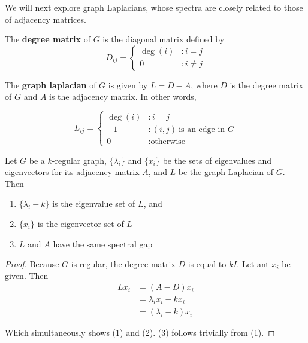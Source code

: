 We will next explore graph Laplacians, whose spectra are closely related to
those of adjacency matrices.

\begin{definition}
  The \textbf{degree matrix} of $G$ is the diagonal matrix defined by
  \[
    D_{ij} = \begin{cases}
      \deg(i) &: i = j \\
      0 &: i \neq j
    \end{cases}
  \]
\end{definition}

\begin{definition}
  The \textbf{graph laplacian} of $G$ is given by $L = D - A$, where $D$ is the
  degree matrix of $G$ and $A$ is the adjacency matrix. In other words,

  \[
    L_{ij} = \begin{cases}
      \deg(i) &: i=j \\
      -1 &: (i,j) ~\text{is an edge in $G$} \\
      0 &: \text{otherwise}
    \end{cases}
  \]
\end{definition}

\begin{proposition}
  Let $G$ be a $k$-regular graph, $\{\lambda_i\}$ and $\{x_i\}$ be the sets of eigenvalues and
  eigenvectors for its adjacency matrix $A$, and $L$ be the graph Laplacian of $G$. Then
  \begin{enumerate}
  \item $\{\lambda_i - k\}$ is the eigenvalue set of $L$, and
  \item $\{x_i\}$ is the eigenvector set of $L$
  \item $L$ and $A$ have the same spectral gap
  \end{enumerate}
\end{proposition}

\begin{proof}
  Because $G$ is regular, the degree matrix $D$ is equal to $kI$. Let ant $x_i$ be given. Then
  \begin{align*}
    Lx_i &= (A-D)x_i \\
         &= \lambda_ix_i - kx_i \\
         &= (\lambda_i - k)x_i
  \end{align*}

  Which simultaneously shows (1) and (2). (3) follows trivially from (1).
\end{proof}

